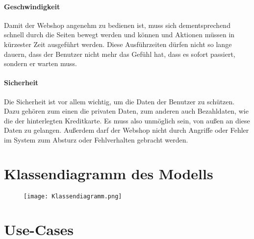 \documentclass[a4paper]{article}
\begin{document}
\paragraph{Geschwindigkeit}
Damit der Webshop angenehm zu bedienen ist, muss sich dementsprechend schnell durch die Seiten bewegt werden und können und Aktionen müssen in kürzester Zeit ausgeführt werden. Diese Ausführzeiten dürfen nicht so lange dauern, dass der Benutzer nicht mehr das Gefühl hat, dass es sofort passiert, sondern er warten muss.

\paragraph{Sicherheit}
Die Sicherheit ist vor allem wichtig, um die Daten der Benutzer zu schützen. Dazu gehören zum einen die privaten Daten, zum anderen auch Bezahldaten, wie die der hinterlegten Kreditkarte. Es muss also unmöglich sein, von außen an diese Daten zu gelangen. Außerdem darf der Webshop nicht durch Angriffe oder Fehler im System zum Absturz oder Fehlverhalten gebracht werden.

\section{Klassendiagramm des Modells}
\begin{figure}[H]
	\centering
	\texttt{[image: Klassendiagramm.png]}
\end{figure}

\section{Use-Cases}
\end{document}
